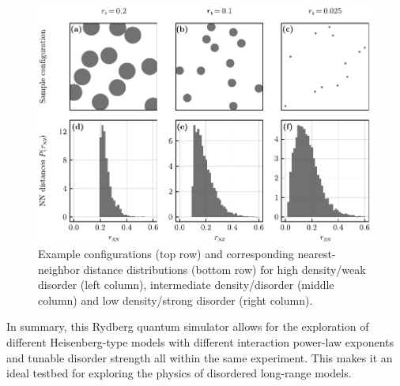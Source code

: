 \begin{figure}[htb]
	\centering
	\includegraphics[width=\textwidth]{gfx/part1/disorder-in-experiment-bw}
	\caption{Example configurations (top row) and corresponding nearest-neighbor distance distributions (bottom row) for high density/weak disorder (left column), intermediate density/disorder (middle column) and low density/strong disorder (right column).}
	\label{fig:disorder-distribution}
\end{figure}

In summary, this Rydberg quantum simulator allows for the exploration of different Heisenberg-type models with different interaction power-law exponents and tunable disorder strength all within the same experiment. This makes it an ideal testbed for exploring the physics of disordered long-range models.
